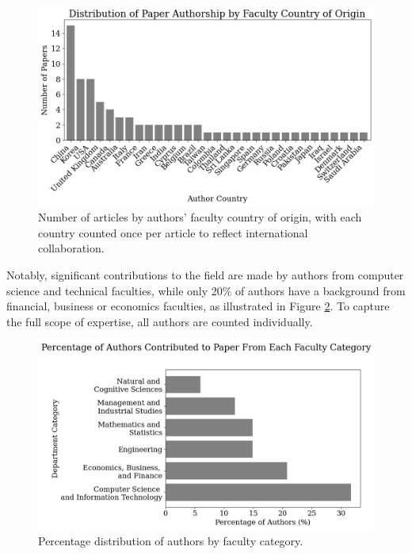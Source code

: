\begin{figure}[H]
    \centering
    \includegraphics[width=1\linewidth]{Images/author_country_origin_per_paper.png}
    \caption{Number of articles by authors' faculty country of origin, with each country counted once per article to reflect international collaboration.}
    \label{fig:author_country_origin_per_paper}
\end{figure}

Notably, significant contributions to the field are made by authors from computer science and technical faculties, while only 20\% of authors have a background from financial, business or economics faculties, as illustrated in Figure \ref{fig:author_faculty_origin}. To capture the full scope of expertise, all authors are counted individually. 


\begin{figure}[H]
    \centering
    \includegraphics[width=1\linewidth]{Images/author_faculty_origin.png}
    \caption{Percentage distribution of authors by faculty category.}
    \label{fig:author_faculty_origin}
\end{figure}

